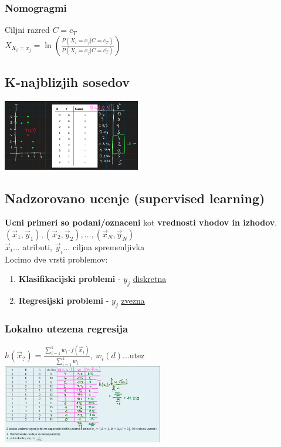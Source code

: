 \subsubsection{Nomogragmi}
Ciljni razred $C=c_T$\\
$X_{X_i=x_j}=\ln \left( \frac{P(X_i=x_j|C=c_T)}{P(X_i=x_j|C=\overline{c_T})} \right)$

\subsection{K-najblizjih sosedov}
\includegraphics[width=6cm]{./images/knn.png}

\subsection{Nadzorovano ucenje (supervised learning)}
\textbf{Ucni primeri so podani/oznaceni} kot \textbf{vrednosti vhodov in izhodov}.\\
$(\vec{x}_1,\vec{y}_1),(\vec{x}_2,\vec{y}_2),\dots,(\vec{x}_N,\vec{y}_N)$\\
$\vec{x}_i\dots$ atributi, $\vec{y}_i\dots$ ciljna spremenljivka\\
Locimo dve vrsti problemov:
\begin{enumerate}[leftmargin=*,noitemsep,topsep=0pt,partopsep=0pt]
    \item \textbf{Klasifikacijski problemi} - $y_j$ \underline{diskretna} 
    \item \textbf{Regresijski problemi} - $y_j$ \underline{zvezna} 
\end{enumerate}

\subsubsection{Lokalno utezena regresija}
$h(\vec{x}_?) = \frac{\sum\limits_{i=1}^k w_i\cdot f(\vec{x}_i)}{\sum\limits_{i=1}^k w_i}, \: w_i(d) ... \text{utez}$\\
\includegraphics[width=7cm]{./images/lokalno-utezena-regresija.png}

